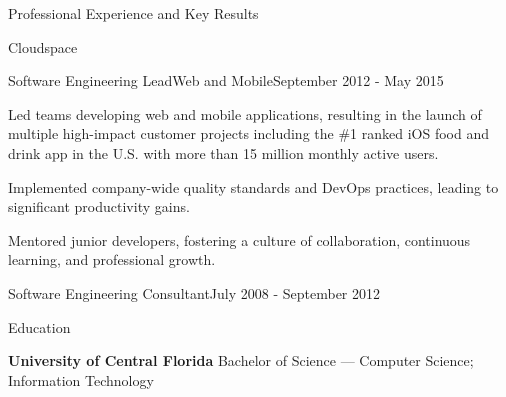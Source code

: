 \documentclass{resume} %
\begin{document}
\begin{rSection}{Professional Experience and Key Results}
  \begin{rCompany}{Cloudspace}{}{}
    \begin{rRole}{Software Engineering Lead}{Web and Mobile}{September 2012 - May 2015}
      \item Led teams developing web and mobile applications, resulting in the launch of multiple high-impact customer projects including the \#1 ranked iOS food and drink app in the U.S. with more than 15 million monthly active users.
      \item Implemented company-wide quality standards and DevOps practices, leading to significant productivity gains.
      \item Mentored junior developers, fostering a culture of collaboration, continuous learning, and professional growth.
    \end{rRole}
  \end{rCompany}

  
  \begin{rCompany}{Software Engineering Consultant}{July 2008 - September 2012}{}

  \end{rCompany}
  
  
  
\end{rSection}

\vspace{0.5em} %
\begin{rSection}{Education}
  
  {\bf University of Central Florida } Bachelor of Science --- Computer Science; Information Technology
  
\end{rSection}
\end{document}

